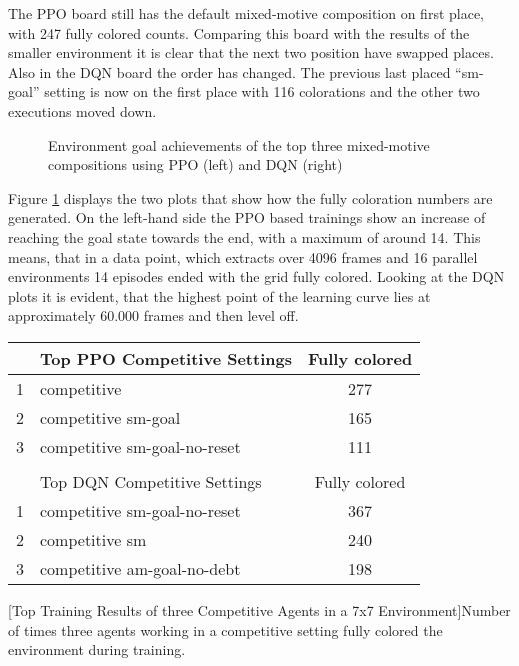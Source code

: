 The PPO board still has the default mixed-motive composition on first place, with 247 fully colored counts. Comparing this board with the results of the smaller environment it is clear that the next two position have swapped places. Also in the DQN board the order has changed. The previous last placed ``sm-goal'' setting is now on the first place with 116 colorations and the other two executions moved down. 

\begin{figure}[hpbt]
    \centering
    \hspace{0.01\textwidth}
    \caption[Plots of fully coloration achievements of the Top Mixed-Motive Modes in a 7x7 Environment]{Environment goal achievements of the top three mixed-motive compositions using PPO (left) and DQN (right)}
    \label{fig:multipic_plots_mixed_hard} %
\end{figure}

Figure \ref{fig:multipic_plots_mixed_hard} displays the two plots that show how the fully coloration numbers are generated. On the left-hand side the PPO based trainings show an increase of reaching the goal state towards the end, with a maximum of around 14. This means, that in a data point, which extracts over 4096 frames and 16 parallel environments 14 episodes ended with the grid fully colored. Looking at the DQN plots it is evident, that the highest point of the learning curve lies at approximately 60.000 frames and then level off.

\begin{center}
\begin{tabular}{clc}\hline
      & Top PPO Competitive Settings & Fully colored \\ \hline
    {\small 1} & competitive & 277 \\
    {\small 2} & competitive sm-goal & 165 \\
    {\small 3} & competitive sm-goal-no-reset & 111 \\ \hline
      &   \\ \hline
      & Top DQN Competitive Settings & Fully colored \\ \hline
    {\small 1} & competitive sm-goal-no-reset & 367 \\
    {\small 2} & competitive sm & 240 \\
    {\small 3} & competitive am-goal-no-debt & 198 \\ \hline
    \end{tabular}
    [Top Training Results of three Competitive Agents in a 7x7 Environment]{Number of times three agents working in a competitive setting fully colored the environment during training.}\label{t:3-comp-hard}
\end{center}

